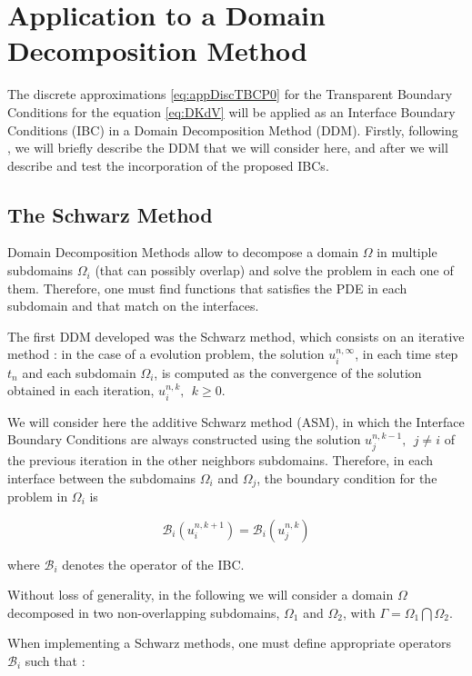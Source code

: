 \section{Application to a Domain Decomposition Method}

\indent The discrete approximations \eqref{eq:appDiscTBCP0} for the Transparent Boundary Conditions for the equation \eqref{eq:DKdV} will be applied as an Interface Boundary Conditions (IBC) in a Domain Decomposition Method (DDM). Firstly, following \cite{Japhet2003}, we will briefly describe the DDM that we will consider here, and after we will describe and test the incorporation of the proposed IBCs.

\subsection{The Schwarz Method}

\indent Domain Decomposition Methods allow to decompose a domain $\Omega$ in multiple subdomains $\Omega_i$ (that can possibly overlap) and solve the problem in each one of them. Therefore, one must find functions that satisfies the PDE in each subdomain and that match on the interfaces. 

\indent The first DDM developed was the Schwarz method, which consists on an iterative method : in the case of a evolution problem, the solution  $u_i^{n,\infty}$, in each time step $t_n$ and each subdomain $\Omega_i$, is computed as the convergence of the solution obtained in each iteration, $u_i^{n,k}, \ \ k\geq 0$. 

\indent We will consider here the additive Schwarz method (ASM), in which the Interface Boundary Conditions are always constructed using the solution $u_j^{n,k-1}, \ \ j \neq i$ of the previous iteration in the other neighbors subdomains. Therefore, in each interface between the subdomains $\Omega_i$ and $\Omega_j$, the boundary condition for the problem in $\Omega_i$ is

$$\mathcal{B}_i(u_i^{n,k+1}) = \mathcal{B}_i(u_j^{n,k})$$

\noindent where $\mathcal{B}_i$ denotes the operator of the IBC.

\indent Without loss of generality, in the following we will consider a domain $\Omega$ decomposed in two non-overlapping subdomains, $\Omega_1$ and $\Omega_2$, with $\Gamma = \Omega_1 \bigcap \Omega_2$.

\indent When implementing a Schwarz methods, one must define appropriate operators $\mathcal{B}_i$ such that :

